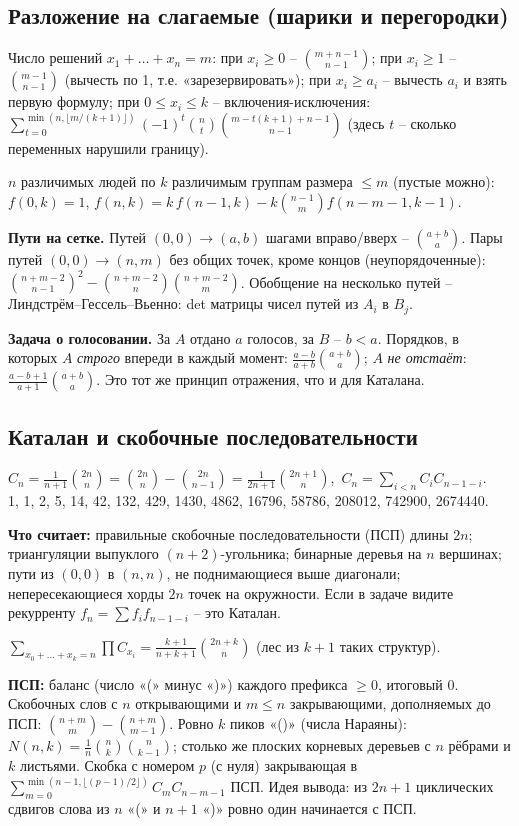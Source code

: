 \subsection{Разложение на слагаемые (шарики и перегородки)}
Число решений $x_1+\dots+x_n=m$: при $x_i\ge0$ -- $\binom{m+n-1}{n-1}$; при $x_i\ge1$ -- $\binom{m-1}{n-1}$ (вычесть по 1, т.е. «зарезервировать»); при $x_i\ge a_i$ -- вычесть $a_i$ и взять первую формулу; при $0\le x_i\le k$ -- включения-исключения: $\sum_{t=0}^{\min(n,\lfloor m/(k+1)\rfloor)}(-1)^t\binom nt\binom{m-t(k+1)+n-1}{n-1}$ (здесь $t$ -- сколько переменных нарушили границу).
\par $n$ различимых людей по $k$ различимым группам размера $\le m$ (пустые можно): $f(0,k)=1$, $f(n,k)=k\,f(n{-}1,k)-k\binom{n-1}mf(n{-}m{-}1,k{-}1)$.
\par \textbf{Пути на сетке.} Путей $(0,0)\to(a,b)$ шагами вправо/вверх -- $\binom{a+b}a$. Пары путей $(0,0)\to(n,m)$ без общих точек, кроме концов (неупорядоченные): $\binom{n+m-2}{n-1}^2-\binom{n+m-2}n\binom{n+m-2}m$. Обобщение на несколько путей -- Линдстрём--Гессель--Вьенно: det матрицы чисел путей из $A_i$ в $B_j$.
\par \textbf{Задача о голосовании.} За $A$ отдано $a$ голосов, за $B$ -- $b<a$. Порядков, в которых $A$ \emph{строго} впереди в каждый момент: $\frac{a-b}{a+b}\binom{a+b}a$; $A$ \emph{не отстаёт}: $\frac{a-b+1}{a+1}\binom{a+b}a$. Это тот же принцип отражения, что и для Каталана.
\subsection{Каталан и скобочные последовательности}
$C_n=\frac1{n+1}\binom{2n}n=\binom{2n}n-\binom{2n}{n-1}=\frac1{2n+1}\binom{2n+1}n$,\ $C_n=\sum_{i<n}C_iC_{n-1-i}$.\\
{\footnotesize 1, 1, 2, 5, 14, 42, 132, 429, 1430, 4862, 16796, 58786, 208012, 742900, 2674440}.
\par \textbf{Что считает:} правильные скобочные последовательности (ПСП) длины $2n$; триангуляции выпуклого $(n{+}2)$-угольника; бинарные деревья на $n$ вершинах; пути из $(0,0)$ в $(n,n)$, не поднимающиеся выше диагонали; непересекающиеся хорды $2n$ точек на окружности. Если в задаче видите рекурренту $f_n=\sum f_if_{n-1-i}$ -- это Каталан.
\par $\sum_{x_0+\dots+x_k=n}\prod C_{x_i}=\frac{k+1}{n+k+1}\binom{2n+k}n$ (лес из $k{+}1$ таких структур).
\par \textbf{ПСП:} баланс (число «(» минус «)») каждого префикса $\ge0$, итоговый $0$. Скобочных слов с $n$ открывающими и $m\le n$ закрывающими, дополняемых до ПСП: $\binom{n+m}m-\binom{n+m}{m-1}$. Ровно $k$ пиков «()» (числа Нараяны): $N(n,k)=\frac1n\binom nk\binom n{k-1}$; столько же плоских корневых деревьев с $n$ рёбрами и $k$ листьями. Скобка с номером $p$ (с нуля) закрывающая в $\sum_{m=0}^{\min(n-1,\lfloor(p-1)/2\rfloor)}C_mC_{n-m-1}$ ПСП. Идея вывода: из $2n{+}1$ циклических сдвигов слова из $n$ «(» и $n{+}1$ «)» ровно один начинается с ПСП.
